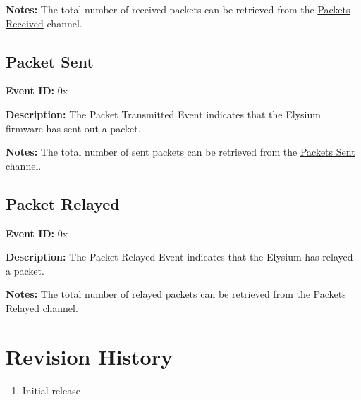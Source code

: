 \documentclass{hitec}
\newcounter{idval}
\newcommand*{\elyid}[0]{0x\padzeroes[2]\Hexadecimal{idval}\addtocounter{idval}{1}}
\let\oldaddcontentsline\addcontentsline
\newcommand{\starttocentries}{\let\addcontentsline\oldaddcontentsline}
\begin{document}
\noindent \textbf{Notes:} The total number of received packets can be retrieved
from the \hyperref[chan:slippktrecv]{Packets Received} channel.

\subsection{Packet Sent}
\label{evt:slipsent}

\noindent \textbf{Event ID:} \elyid 

\noindent \textbf{Description:} The Packet Transmitted Event indicates that the
Elysium firmware has sent out a packet.

\noindent \textbf{Notes:} The total number of sent packets can be retrieved
from the \hyperref[chan:slippktsend]{Packets Sent} channel.

\subsection{Packet Relayed}
\label{evt:sliprelay}

\noindent \textbf{Event ID:} \elyid 

\noindent \textbf{Description:} The Packet Relayed Event indicates that the
Elysium has relayed a packet.

\noindent \textbf{Notes:} The total number of relayed packets can be retrieved
from the \hyperref[chan:slippktrelay]{Packets Relayed} channel.

\starttocentries

\appendix

\section{Revision History}

\begin{enumerate}
		\item Initial release
\end{enumerate}
\end{document}
